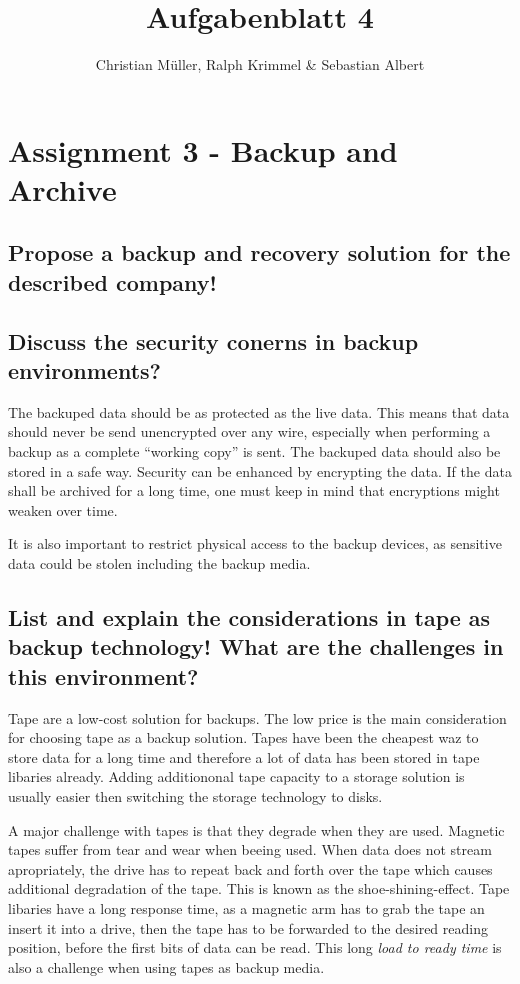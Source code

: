 \documentclass{article}
\title{Aufgabenblatt 4}
\author{Christian Müller, Ralph Krimmel \& Sebastian Albert }
\begin{document}
\maketitle

\section*{Assignment 3 - Backup and Archive}

\subsection{Propose a backup and recovery solution for the described company!}

\subsection{Discuss the security conerns in backup environments?}
		The backuped data should be as protected as the live data.
		This means that data should never be send unencrypted over any wire,
		especially when performing a backup
		as a complete ``working copy'' is sent.
		The backuped data should also be stored in a safe way.
		Security can be enhanced by encrypting the data.
		If the data shall be archived for a long time,
		one must keep in mind that encryptions might weaken over time.

		It is also important to restrict physical access to the backup devices,
		as sensitive data could be stolen including the backup media.

\subsection{List and explain the considerations in tape as backup technology!
				What are the challenges in this environment?}
	Tape are a low-cost solution for backups.
	The low price is the main consideration for choosing tape as a backup solution.
	Tapes have been the cheapest waz to store data for a long time
	and therefore a lot of data has been stored in tape libaries already.
	Adding additiononal tape capacity to a storage solution is usually easier 
	then switching the storage technology to disks.
	
	A major challenge with tapes is that they degrade when they are used.
	Magnetic tapes suffer from tear and wear when beeing used.
	When data does not stream apropriately,
	the drive has to repeat back and forth over the tape
	which causes additional degradation of the tape.
	This is known as the shoe-shining-effect.
	Tape libaries have a long response time,
	as a magnetic arm has to grab the tape an insert it into a drive,
	then the tape has to be forwarded to the desired reading position,
	before the first bits of data can be read.
	This long \textsl{load to ready time} is also a challenge when using tapes as backup media.
\end{document}
